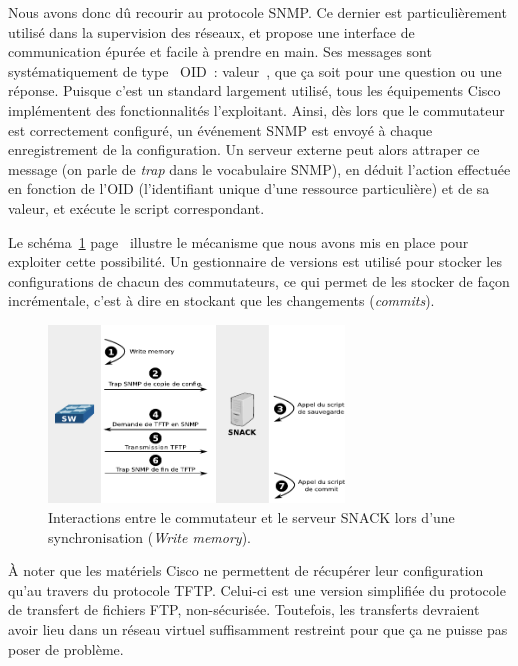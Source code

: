 Nous avons donc dû recourir au protocole SNMP. Ce dernier est particulièrement utilisé dans la supervision des réseaux, et propose une interface de communication épurée et facile à prendre en main. Ses messages sont systématiquement de type \og~OID~: valeur~\fg, que ça soit pour une question ou une réponse. Puisque c'est un standard largement utilisé, tous les équipements Cisco implémentent des fonctionnalités l'exploitant. Ainsi, dès lors que le commutateur est correctement configuré, un événement SNMP est envoyé à chaque enregistrement de la configuration. Un serveur externe peut alors attraper ce message (on parle de \emph{trap} dans le vocabulaire SNMP), en déduit l'action effectuée en fonction de l'OID (l'identifiant unique d'une ressource particulière) et de sa valeur, et exécute le script correspondant.

Le schéma~\ref{schema_wrmem} page~\pageref{schema_wrmem} illustre le mécanisme que nous avons mis en place pour exploiter cette possibilité. Un gestionnaire de versions est utilisé pour stocker les configurations de chacun des commutateurs, ce qui permet de les stocker de façon incrémentale, c'est à dire en stockant que les changements (\emph{commits}).

\begin{figure}[!h]
	\begin{center}
	    \includegraphics[width=0.7\textwidth]{img/wrmem.pdf}
	\end{center}
	\caption{Interactions entre le commutateur et le serveur SNACK lors d'une synchronisation (\emph{Write memory}).}
	\label{schema_wrmem}
\end{figure}

À noter que les matériels Cisco ne permettent de récupérer leur configuration qu'au travers du protocole TFTP. Celui-ci est une version simplifiée du protocole de transfert de fichiers FTP, non-sécurisée. Toutefois, les transferts devraient avoir lieu dans un réseau virtuel suffisamment restreint pour que ça ne puisse pas poser de problème.

